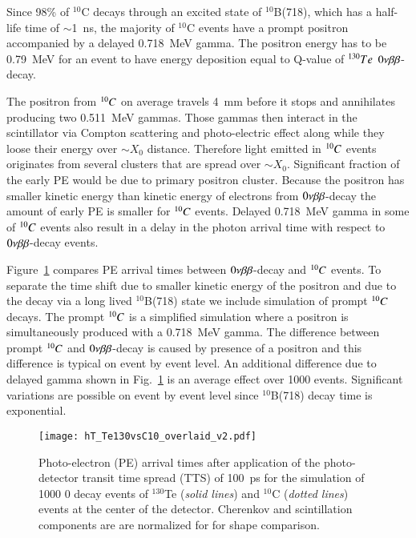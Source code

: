 Since 98\% of $^{10}$C decays through an excited state of $^{10}$B(718), 
which has a half-life time of $\sim$1~ns, the majority of $^{10}$C events have 
a prompt positron accompanied by a delayed 0.718~MeV gamma. The positron energy
has to be 0.79~MeV for an event to have energy deposition equal to Q-value of
$^{130}Te$ $0\nu\beta\beta$-decay.

The positron from $^{10}C$ on average travels 4~mm before it stops and annihilates
producing two 0.511~MeV gammas. Those gammas then interact in the scintillator via 
Compton scattering and photo-electric effect along while they loose their energy
over $\sim X_0$ distance. Therefore light emitted in $^{10}C$ events originates from
several clusters that are spread over $\sim X_0$. Significant fraction of the 
early PE would be due to primary positron cluster. Because the positron has smaller 
kinetic energy than kinetic energy of electrons from $0\nu\beta\beta$-decay the amount of early 
PE is smaller for $^{10}C$ events. Delayed 0.718~MeV gamma in some of $^{10}C$ events 
also result in a delay in the photon arrival time with respect to $0\nu\beta\beta$-decay events.

Figure~\ref{fig:Arrival_time_C10_overlaid} compares PE arrival times between 
$0\nu\beta\beta$-decay and $^{10}C$ events. To separate the time shift due to smaller kinetic 
energy of the positron and due to the decay via a long lived $^{10}$B(718) state we 
include simulation of prompt $^{10}C$ decays. The prompt $^{10}C$ is a simplified simulation 
where a positron is simultaneously produced with a 0.718~MeV gamma. The difference between
prompt $^{10}C$ and $0\nu\beta\beta$-decay is caused by presence of a positron and this 
difference is typical on event by event level. An additional difference due to delayed
gamma shown in Fig.~\ref{fig:Arrival_time_C10_overlaid} is an average effect over 1000 events. 
Significant variations are possible on event by event level since $^{10}$B(718) decay 
time is exponential.

\begin{figure}[h]
  \centering
  \texttt{[image: hT\_Te130vsC10\_overlaid\_v2.pdf]}
  \caption{Photo-electron (PE) arrival times after application of the
    photo-detector transit time spread (TTS) of 100~ps for the
    simulation of 1000 0{\nbb} decay events of $^{130}$Te (\emph{solid
      lines}) and $^{10}$C (\emph{dotted lines}) events at the center
    of the detector. Cherenkov and scintillation components are are normalized for 
    for shape comparison.}
\label{fig:Arrival_time_C10_overlaid}
\end{figure}

